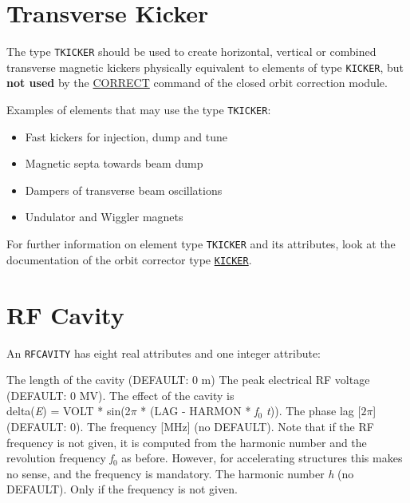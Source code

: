 \section{Transverse Kicker}
\label{sec:tkicker}

The type \texttt{TKICKER} should be used to create horizontal, vertical or
combined transverse magnetic kickers physically equivalent to elements of type
\texttt{KICKER}, but \textbf{not used} by the \hyperref[sec:correct]{CORRECT} 
command of the closed orbit correction module.

Examples of elements that may use the type \texttt{TKICKER}: 
\begin{itemize}
   \item Fast kickers for injection, dump and tune
   \item Magnetic septa towards beam dump
   \item Dampers of transverse beam oscillations
   \item Undulator and Wiggler magnets
\end{itemize}

For further information on element type \texttt{TKICKER} and its attributes, look
at the documentation of the orbit corrector type
\hyperref[sec:kicker]{\texttt{KICKER}}.   


\section{RF Cavity}
\label{sec:rf-cavity}\label{sec:rfcavity}




An \texttt{RFCAVITY} has eight real attributes and one integer attribute: 
\begin{madlist}
    The length of the cavity (DEFAULT: 0 m) 
    The peak electrical RF voltage (DEFAULT: 0 MV). The effect of 
   the cavity is \\
     delta(\textit{E}) = VOLT * sin(2$\pi$ * (LAG - HARMON * \textit{f$_0$ t})). 
    The phase lag [$2\pi$] (DEFAULT: 0). 
    The frequency [MHz] (no DEFAULT). Note that if the RF
     frequency is not given, it is computed from the harmonic number and
     the revolution frequency \textit{f$_0$} as before. However, for
     accelerating structures this makes no sense, and the frequency is
     mandatory.  
    The harmonic number \textit{h} (no DEFAULT). Only if
     the frequency is not given.  
\end{madlist}

